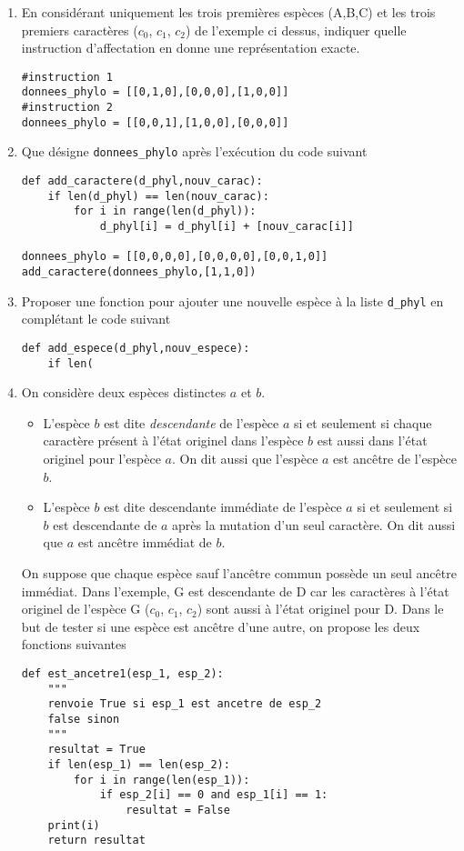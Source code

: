 \begin{enumerate}
  \item En considérant uniquement les trois premières espèces (A,B,C) et les trois premiers caractères ($c_0$, $c_1$, $c_2$) de l'exemple ci dessus, indiquer quelle instruction d'affectation en donne une représentation exacte.
\begin{verbatim}
#instruction 1
donnees_phylo = [[0,1,0],[0,0,0],[1,0,0]] 
#instruction 2
donnees_phylo = [[0,0,1],[1,0,0],[0,0,0]] 
\end{verbatim}
\item Que désigne \verb|donnees_phylo| après l'exécution du code suivant
\begin{verbatim}
def add_caractere(d_phyl,nouv_carac):
    if len(d_phyl) == len(nouv_carac):
        for i in range(len(d_phyl)):
            d_phyl[i] = d_phyl[i] + [nouv_carac[i]]

donnees_phylo = [[0,0,0,0],[0,0,0,0],[0,0,1,0]]
add_caractere(donnees_phylo,[1,1,0])
\end{verbatim}
\item Proposer une fonction pour ajouter une nouvelle espèce à la liste \verb|d_phyl| en complétant le code suivant
\begin{verbatim}
def add_espece(d_phyl,nouv_espece):
    if len(
\end{verbatim}
\item On considère deux espèces distinctes $a$ et $b$.
\begin{itemize}
  \item L'espèce $b$ est dite \emph{descendante} de l'espèce $a$ si et seulement si chaque caractère présent à l'état originel dans l'espèce $b$ est aussi dans l'état originel pour l'espèce $a$. On dit aussi que l'espèce $a$ est ancêtre de l'espèce $b$.
  \item L'espèce $b$ est dite descendante immédiate de l'espèce $a$ si et seulement si $b$ est descendante de $a$ après la mutation d'un seul caractère. On dit aussi que $a$ est ancêtre immédiat de $b$.
\end{itemize}
On suppose que chaque espèce sauf l'ancêtre commun possède un seul ancêtre immédiat.\newline
Dans l'exemple, G est descendante de D car les caractères à l'état originel de l'espèce G ($c_0$, $c_1$, $c_2$) sont aussi à l'état originel pour D. \newline
Dans le but de tester si une espèce est ancêtre d'une autre, on propose les deux fonctions suivantes
\begin{verbatim}
def est_ancetre1(esp_1, esp_2):
    """
    renvoie True si esp_1 est ancetre de esp_2
    false sinon
    """
    resultat = True
    if len(esp_1) == len(esp_2):
        for i in range(len(esp_1)):
            if esp_2[i] == 0 and esp_1[i] == 1:
                resultat = False
    print(i)
    return resultat


\end{verbatim}
\end{enumerate}
